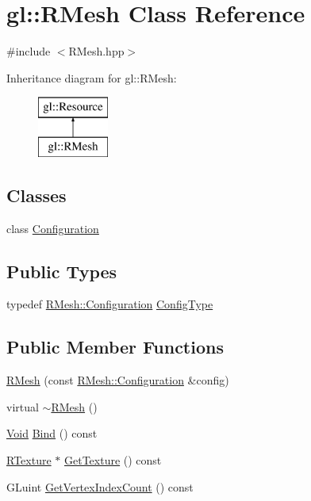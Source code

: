 \hypertarget{classgl_1_1_r_mesh}{\section{gl\-:\-:R\-Mesh Class Reference}
\label{classgl_1_1_r_mesh}
}


{\ttfamily \#include $<$R\-Mesh.\-hpp$>$}

Inheritance diagram for gl\-:\-:R\-Mesh\-:\begin{figure}[H]
\begin{center}
\leavevmode
\includegraphics[height=2.000000cm]{classgl_1_1_r_mesh}
\end{center}
\end{figure}
\subsection*{Classes}
\begin{DoxyCompactItemize}
\item 
class \hyperlink{classgl_1_1_r_mesh_1_1_configuration}{Configuration}
\end{DoxyCompactItemize}
\subsection*{Public Types}
\begin{DoxyCompactItemize}
\item 
typedef \hyperlink{classgl_1_1_r_mesh_1_1_configuration}{R\-Mesh\-::\-Configuration} \hyperlink{classgl_1_1_r_mesh_a79f410d038549426f50fb60ea46f3ebd}{Config\-Type}
\end{DoxyCompactItemize}
\subsection*{Public Member Functions}
\begin{DoxyCompactItemize}
\item 
\hyperlink{classgl_1_1_r_mesh_a4d0f4e90717bf32767364d3e2bb7d0fa}{R\-Mesh} (const \hyperlink{classgl_1_1_r_mesh_1_1_configuration}{R\-Mesh\-::\-Configuration} \&config)
\item 
virtual \hyperlink{classgl_1_1_r_mesh_afb0492fdc604d1db50a17d84fb46250e}{$\sim$\-R\-Mesh} ()
\item 
\hyperlink{_basic_types_8hpp_afdf0f22c576e6ee1b982f64b839c4bea}{Void} \hyperlink{classgl_1_1_r_mesh_afe64f717298a3d2d3eaa6271156dc54a}{Bind} () const 
\item 
\hyperlink{classgl_1_1_r_texture}{R\-Texture} $\ast$ \hyperlink{classgl_1_1_r_mesh_ada1eb2ce86eda9fa108347604b9f4068}{Get\-Texture} () const 
\item 
G\-Luint \hyperlink{classgl_1_1_r_mesh_aad7602f1be7e89104e2a37e3067794ff}{Get\-Vertex\-Index\-Count} () const 
\end{DoxyCompactItemize}
